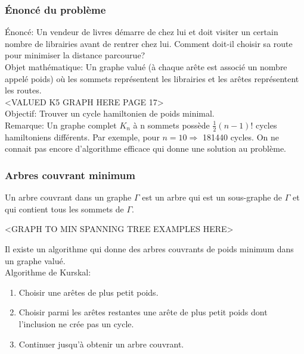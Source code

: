 \subsubsection{Énoncé du problème}

Énoncé: Un vendeur de livres démarre de chez lui et doit visiter un certain nombre de librairies avant de rentrer chez lui. Comment doit-il choisir sa route pour minimiser la distance parcourue? \\ 

Objet mathématique: Un graphe valué (à chaque arête est associé un nombre appelé poids) où les sommets représentent les librairies et les arêtes représentent les routes.\\

<VALUED K5 GRAPH HERE PAGE 17>\\

Objectif: Trouver un cycle hamiltonien de poids minimal.\\

Remarque: Un graphe complet $K_{n}$ à n sommets possède $\frac{1}{2}(n-1)!$ cycles hamiltoniens différents. Par exemple, pour $n=10 \Rightarrow$ 181440 cycles. On ne connait pas encore d'algorithme efficace qui donne une solution au problème.\\

\subsubsection{Arbres couvrant minimum}

\begin{defn}
Un arbre couvrant dans un graphe $\Gamma$ est un arbre qui est un sous-graphe de $\Gamma$ et qui contient tous les sommets de $\Gamma$.\\
\end{defn}

\begin{exmp}
<GRAPH TO MIN SPANNING TREE EXAMPLES HERE>\\
\end{exmp}

Il existe un algorithme qui donne des arbres couvrants de poids minimum dans un graphe valué.\\

Algorithme de Kurskal:
\begin{enumerate}[i]
	\item Choisir une arêtes de plus petit poids.
	\item Choisir parmi les arêtes restantes une arête de plus petit poids dont l'inclusion ne crée pas un cycle.
	\item Continuer jusqu'à obtenir un arbre couvrant.\\
\end{enumerate}

